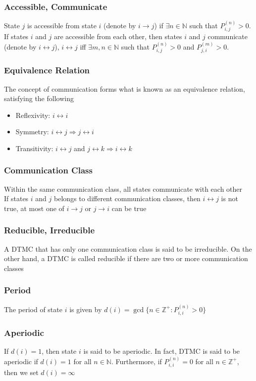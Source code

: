 \documentclass[11pt]{article}
\newcommand{\N}{{\mathbb{N}}}
\newcommand{\Z}{{\mathbb{Z}}}
\begin{document}
\subsubsection{Accessible, Communicate}
State $j$ is accessible from state $i$ (denote by $i\to j$) if $\exists n\in\N$ such that 
$P_{i,j}^{(n)}>0$. If states $i$ and $j$ are accessible from each other, then states $i$ and $j$ communicate (denote by $i\leftrightarrow j$), 
$i\leftrightarrow j$ iff $\exists m,n\in\N$ such that $P_{i,j}^{(n)}>0$ and $P_{j,i}^{(m)}>0$.
\subsubsection{Equivalence Relation}
The concept of communication forms what is known as an equivalence relation, satisfying the following 
\begin{itemize}
    \item Reflexivity: $i\leftrightarrow i$
    \item Symmetry: $i\leftrightarrow j \Rightarrow j\leftrightarrow i$
    \item Transitivity: $i\leftrightarrow j$ and $j\leftrightarrow k \Rightarrow i\leftrightarrow k$
\end{itemize}
\subsubsection{Communication Class}
Within the same communication class, all states communicate with each other \\
If states $i$ and $j$ belongs to different communication classes, then $i\leftrightarrow j$ is not true, at most one of $i\to j$ or $j\to i$ can be true 
\subsubsection{Reducible, Irreducible}
A DTMC that has only one communication class is said to be irreducible. On the other hand, a DTMC is 
called reducible if there are two or more communication classes 
\subsubsection{Period}
The period of state $i$ is given by $d(i) = \gcd\{n\in\Z^+: P_{i,i}^{(n)}>0\}$
\subsubsection*{Aperiodic}
If $d(i)=1$, then state $i$ is said to be aperiodic. In fact, DTMC is said to be aperiodic if $d(i)=1$ for all $n\in\N$. Furthermore,
if $P_{i,i}^{(n)}=0$ for all $n\in\Z^+$, then we set $d(i)=\infty$ 
\end{document}
